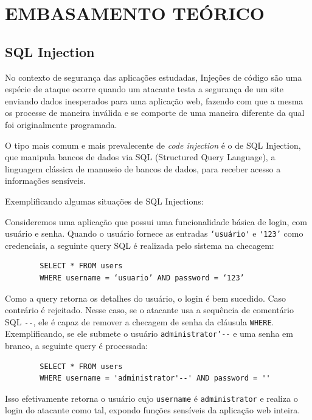 \chapter{EMBASAMENTO TEÓRICO}
\label{chp:capitulo3}

\section{SQL Injection}

No contexto de segurança das aplicações estudadas, Injeções de código são uma espécie de ataque ocorre quando um atacante testa a segurança de um site enviando dados inesperados para uma aplicação web, fazendo com que a mesma os processe de maneira inválida e se comporte de uma maneira diferente da qual foi originalmente programada. 

O tipo mais comum e mais prevalecente de \textit{code injection} é o de SQL Injection, que manipula bancos de dados via SQL (Structured Query Language), a linguagem clássica de manuseio de bancos de dados, para receber acesso a informações sensíveis.

Exemplificando algumas situações de SQL Injections:

\begin{alineas}
    \item 
    Consideremos uma aplicação que possui uma funcionalidade básica de login, com usuário e senha. Quando o usuário fornece as entradas \verb+‘usuário'+ e \verb+'123’+ como credenciais, a seguinte query SQL é realizada pelo sistema na checagem:
    
    \begin{verbatim}
        SELECT * FROM users 
        WHERE username = ‘usuario’ AND password = ‘123’
    \end{verbatim}
    
    Como a query retorna os detalhes do usuário, o login é bem sucedido. Caso contrário  é rejeitado. Nesse caso, se o atacante usa a sequência de comentário SQL \verb+--+, ele é capaz de remover a checagem de senha da cláusula \verb+WHERE+. Exemplificando, se ele submete o usuário \verb+administrator’--+ e uma senha em branco, a seguinte query é processada:
    
    \begin{verbatim}
        SELECT * FROM users 
        WHERE username = 'administrator'--' AND password = '' 
    \end{verbatim}
    
    Isso efetivamente retorna o usuário cujo \verb+username+ é \verb+administrator+ e realiza o login do atacante como tal, expondo funções sensíveis da aplicação web inteira.

\end{alineas}

